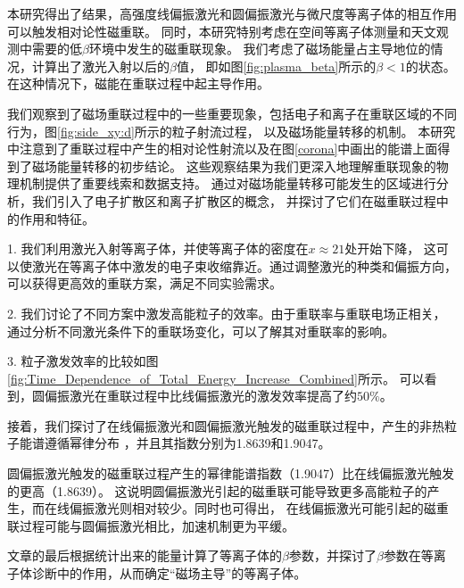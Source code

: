 本研究得出了结果，高强度线偏振激光和圆偏振激光与微尺度等离子体的相互作用可以触发相对论性磁重联。
同时，本研究特别考虑在空间等离子体测量和天文观测中需要的低$\beta$环境中发生的磁重联现象。
我们考虑了磁场能量占主导地位的情况，计算出了激光入射以后的$\beta$值，
即如图\ref{fig:plasma_beta}所示的$\beta< 1$的状态。在这种情况下，磁能在重联过程中起主导作用。

我们观察到了磁场重联过程中的一些重要现象，包括电子和离子在重联区域的不同行为，图\ref{fig:side_xy:d}所示的粒子射流过程，
以及磁场能量转移的机制。
本研究中注意到了重联过程中产生的相对论性射流以及在图\ref{corona}中画出的能谱上面得到了磁场能量转移的初步结论。
这些观察结果为我们更深入地理解重联现象的物理机制提供了重要线索和数据支持。
通过对磁场能量转移可能发生的区域进行分析，我们引入了电子扩散区和离子扩散区的概念，
并探讨了它们在磁重联过程中的作用和特征。

1. 我们利用激光入射等离子体，并使等离子体的密度在$x \approx 21$处开始下降，
这可以使激光在等离子体中激发的电子束收缩靠近。通过调整激光的种类和偏振方向，
可以获得更高效的重联方案，满足不同实验需求。

2. 我们讨论了不同方案中激发高能粒子的效率。由于重联率与重联电场正相关，
通过分析不同激光条件下的重联场变化，可以了解其对重联率的影响。

3. 粒子激发效率的比较如图\ref{fig:Time_Dependence_of_Total_Energy_Increase_Combined}所示。
可以看到，圆偏振激光在重联过程中比线偏振激光的激发效率提高了约$50\%$。

接着，我们探讨了在线偏振激光和圆偏振激光触发的磁重联过程中，产生的非热粒子能谱遵循幂律分布
，并且其指数分别为1.8639和1.9047。

圆偏振激光触发的磁重联过程产生的幂律能谱指数（1.9047）比在线偏振激光触发的更高（1.8639）。
这说明圆偏振激光引起的磁重联可能导致更多高能粒子的产生，而在线偏振激光则相对较少。同时也可得出，
在线偏振激光可能引起的磁重联过程可能与圆偏振激光相比，加速机制更为平缓。

文章的最后根据统计出来的能量计算了等离子体的$\beta$参数，并探讨了$\beta$参数在等离子体诊断中的作用，从而确定“磁场主导”的等离子体。

